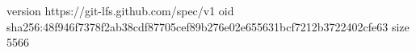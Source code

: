 version https://git-lfs.github.com/spec/v1
oid sha256:48f946f7378f2ab38cdf87705cef89b276e02e655631bcf7212b3722402cfe63
size 5566
